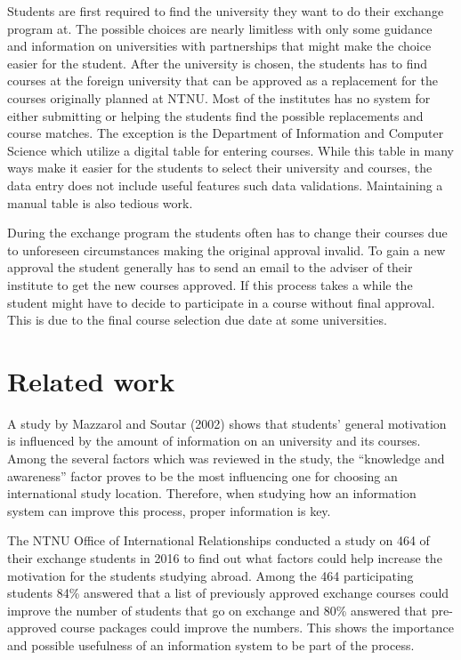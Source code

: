 Students are first required to find the university they want to do their exchange program at. The possible choices are nearly limitless with only some guidance and information on universities with partnerships that might make the choice easier for the student. After the university is chosen, the students has to find courses at the foreign university that can be approved as a replacement for the courses originally planned at NTNU. Most of the institutes has no system for either submitting or helping the students find the possible replacements and course matches. The exception is the Department of Information and Computer Science which utilize a digital table for entering courses. While this table in many ways make it easier for the students to select their university and courses, the data entry does not include useful features such data validations. Maintaining a manual table is also tedious work. 

During the exchange program the students often has to change their courses due to unforeseen circumstances making the original approval invalid. To gain a new approval the student generally has to send an email to the adviser of their institute to get the new courses approved. If this process takes a while the student might have to decide to participate in a course without final approval. This is due to the final course selection due date at some universities. 


\section{Related work} \label{related_work}

A study by Mazzarol and Soutar (2002)\cite{mazzarol2002push} shows that students' general motivation is influenced by the amount of information on an university and its courses. Among the several factors which was reviewed in the study, the \enquote{knowledge and awareness} factor proves to be the most influencing one for choosing an international study location. Therefore, when studying how an information system can improve this process, proper information is key. 

The NTNU Office of International Relationships conducted a study on 464 of their exchange students in 2016 to find out what factors could help increase the motivation for the students studying abroad. Among the 464 participating students 84\% answered that a list of previously approved exchange courses could improve the number of students that go on exchange and 80\% answered that pre-approved course packages could improve the numbers. This shows the importance and possible usefulness of an information system to be part of the process. 

